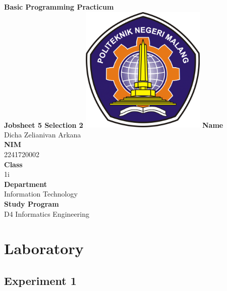 \documentclass[12pt,titlepage]{article}
\newcommand{\vSubject}{Basic Programming Practicum}
\newcommand{\vSubtitle}{Jobsheet 5 Selection 2}
\newcommand{\vName}{Dicha Zelianivan Arkana}
\newcommand{\vNIM}{2241720002}
\newcommand{\vClass}{1i}
\newcommand{\vDepartment}{Information Technology}
\newcommand{\vStudyProgram}{D4 Informatics Engineering}
\begin{document}
\begin{titlepage}
    \centering
    \vfill
    {\bfseries\LARGE
        \vSubject\\
        \vskip0.25cm
        \vSubtitle
    }
    \vfill
    \includegraphics[width=6cm]{images/polinema-logo.png}
    \vfill
    {
        \textbf{Name}\\
        \vName\\
        \vskip0.5cm
        \textbf{NIM}\\
        \vNIM\\
        \vskip0.5cm
        \textbf{Class}\\
        \vClass\\
        \vskip0.5cm
        \textbf{Department}\\
        \vDepartment\\
        \vskip0.5cm
        \textbf{Study Program}\\
        \vStudyProgram
    }
\end{titlepage}

\tableofcontents

\pagebreak

\section{Laboratory}
\subsection{Experiment 1}
\end{document}
